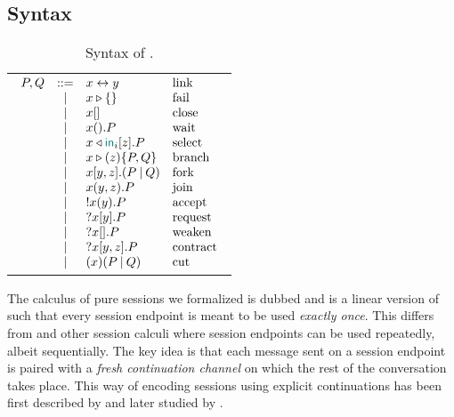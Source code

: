 \section{\Calculus}
\label{sec:calculus}

\subsection{Syntax}
\label{sec:syntax}

\begin{table}
    \caption{Syntax of \Calculus.}\label{tab:syntax}
    \begin{tabular}{c}
        \begin{math}
            \displaystyle
            \begin{array}[t]{rcll}
                P, Q & ::= & \Link\x\y            & \text{link} \\
                    & | & \Fail\x                 & \text{fail} \\
                    & | & \Close\x                & \text{close} \\
                    & | & \Wait\x.P               & \text{wait} \\
                    & | & \Select\x{\InTag_i}\z.P & \text{select} \\
                    & | & \Case\x\z{P}{Q}         & \text{branch} \\
                    & | & \Fork\x\y\z{P}{Q}       & \text{fork} \\
                    & | & \Join\x\y\z.P           & \text{join} \\
                    & | & \Server\x\y.P           & \text{accept} \\
                    & | & \Client\x\y.P           & \text{request} \\
                    & | & \Weaken\x.P             & \text{weaken} \\
                    & | & \Contract\x\y\z.P       & \text{contract} \\
                    & | & \Cut\x{P}{Q}            & \text{cut} \\
            \end{array}
        \end{math}
    \end{tabular}
\end{table}

The calculus of pure sessions we formalized is dubbed \Calculus and is a linear
version of \CP~\citep{Wadler14,GayVasconcelos25} such that every session
endpoint is meant to be used \emph{exactly once}. This differs from \CP and
other session calculi where session endpoints can be used repeatedly, albeit
sequentially. The key idea is that each message sent on a session endpoint is
paired with a \emph{fresh continuation channel} on which the rest of the
conversation takes place.
%
This way of encoding sessions using explicit continuations has been first
described by \citet[extended version]{Kobayashi02b} and later studied by
\citet{DardhaGiachinoSangiorgi17}.

